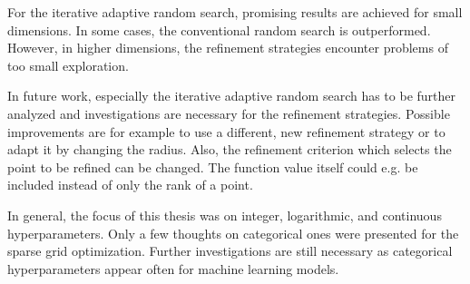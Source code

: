 For the iterative adaptive random search, promising results are achieved for small dimensions. In some cases, the conventional random search is outperformed. However, in higher dimensions, the refinement strategies encounter problems of too small exploration. \newline

In future work, especially the iterative adaptive random search has to be further analyzed and investigations are necessary for the refinement strategies. Possible improvements are for example to use a different, new refinement strategy or to adapt it by changing the radius. Also, the refinement criterion which selects the point to be refined can be changed. The function value itself could e.g. be included instead of only the rank of a point. 

In general, the focus of this thesis was on integer, logarithmic, and continuous hyperparameters. Only a few thoughts on categorical ones were presented for the sparse grid optimization. Further investigations are still necessary as categorical hyperparameters appear often for machine learning models.